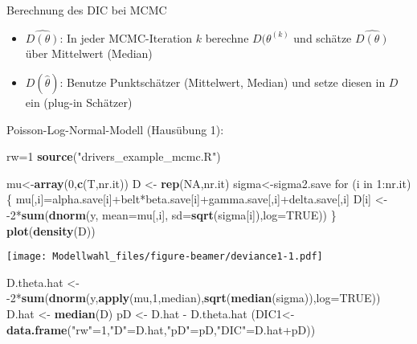 \documentclass[ignorenonframetext,]{beamer}
\newenvironment{Shaded}{\begin{snugshade}}{\end{snugshade}}
\newcommand{\KeywordTok}[1]{\textcolor[rgb]{0.13,0.29,0.53}{\textbf{{#1}}}}
\newcommand{\DataTypeTok}[1]{\textcolor[rgb]{0.13,0.29,0.53}{{#1}}}
\newcommand{\DecValTok}[1]{\textcolor[rgb]{0.00,0.00,0.81}{{#1}}}
\newcommand{\StringTok}[1]{\textcolor[rgb]{0.31,0.60,0.02}{{#1}}}
\newcommand{\OtherTok}[1]{\textcolor[rgb]{0.56,0.35,0.01}{{#1}}}
\newcommand{\NormalTok}[1]{{#1}}
\providecommand{\tightlist}{%
\setlength{\itemsep}{0pt}\setlength{\parskip}{0pt}}
\begin{document}
\begin{frame}{Berechnung des DIC bei MCMC}

\begin{itemize}
\tightlist
\item
  \(\hat{D(\theta)}\): In jeder MCMC-Iteration \(k\) berechne
  \(D(\theta^{(k)}\) und schätze \(\hat{D(\theta)}\) über Mittelwert
  (Median)
\item
  \({D(\hat\theta)}\): Benutze Punktschätzer (Mittelwert, Median) und
  setze diesen in \(D\) ein (plug-in Schätzer)
\end{itemize}

Poisson-Log-Normal-Modell (Hausübung 1):

\begin{Shaded}
\begin{Highlighting}[]
\NormalTok{rw=}\DecValTok{1}
\KeywordTok{source}\NormalTok{(}\StringTok{"drivers_example_mcmc.R"}\NormalTok{)}
\end{Highlighting}
\end{Shaded}

\begin{Shaded}
\begin{Highlighting}[]
\NormalTok{mu<-}\KeywordTok{array}\NormalTok{(}\DecValTok{0}\NormalTok{,}\KeywordTok{c}\NormalTok{(T,nr.it))}
\NormalTok{D <-}\StringTok{ }\KeywordTok{rep}\NormalTok{(}\OtherTok{NA}\NormalTok{,nr.it)}
\NormalTok{sigma<-sigma2.save}
\NormalTok{for (i in }\DecValTok{1}\NormalTok{:nr.it)}
     \NormalTok{\{}
        \NormalTok{mu[,i]=alpha.save[i]+belt*beta.save[i]+gamma.save[,i]+delta.save[,i]}
        \NormalTok{D[i] <-}\StringTok{ }\NormalTok{-}\DecValTok{2}\NormalTok{*}\KeywordTok{sum}\NormalTok{(}\KeywordTok{dnorm}\NormalTok{(y, }\DataTypeTok{mean=}\NormalTok{mu[,i], }\DataTypeTok{sd=}\KeywordTok{sqrt}\NormalTok{(sigma[i]),}\DataTypeTok{log=}\OtherTok{TRUE}\NormalTok{))}
\NormalTok{\}}
\KeywordTok{plot}\NormalTok{(}\KeywordTok{density}\NormalTok{(D))}
\end{Highlighting}
\end{Shaded}

\texttt{[image: Modellwahl\_files/figure-beamer/deviance1-1.pdf]}

\begin{Shaded}
\begin{Highlighting}[]
\NormalTok{D.theta.hat <-}\StringTok{ }\NormalTok{-}\DecValTok{2}\NormalTok{*}\KeywordTok{sum}\NormalTok{(}\KeywordTok{dnorm}\NormalTok{(y,}\KeywordTok{apply}\NormalTok{(mu,}\DecValTok{1}\NormalTok{,median),}\KeywordTok{sqrt}\NormalTok{(}\KeywordTok{median}\NormalTok{(sigma)),}\DataTypeTok{log=}\OtherTok{TRUE}\NormalTok{))}
\NormalTok{D.hat <-}\StringTok{ }\KeywordTok{median}\NormalTok{(D)}
\NormalTok{pD <-}\StringTok{ }\NormalTok{D.hat -}\StringTok{ }\NormalTok{D.theta.hat}
\NormalTok{(DIC1<-}\KeywordTok{data.frame}\NormalTok{(}\StringTok{"rw"}\NormalTok{=}\DecValTok{1}\NormalTok{,}\StringTok{"D"}\NormalTok{=D.hat,}\StringTok{"pD"}\NormalTok{=pD,}\StringTok{"DIC"}\NormalTok{=D.hat+pD))}
\end{Highlighting}
\end{Shaded}


\end{frame}
\end{document}

